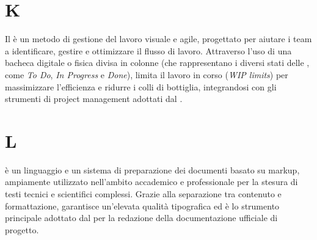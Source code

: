 \section{K}
Il  è un metodo di gestione del lavoro visuale e agile, progettato per aiutare i team a identificare, gestire e ottimizzare il flusso di lavoro. Attraverso l'uso di una bacheca digitale o fisica divisa in colonne (che rappresentano i diversi stati delle , come \emph{To Do}, \emph{In Progress} e \emph{Done}), limita il lavoro in corso (\emph{WIP limits}) per massimizzare l'efficienza e ridurre i colli di bottiglia, integrandosi con gli strumenti di project management adottati dal .
\section{L}
 è un linguaggio e un sistema di preparazione dei documenti basato su markup, ampiamente utilizzato nell'ambito accademico e professionale per la stesura di testi tecnici e scientifici complessi. Grazie alla separazione tra contenuto e formattazione, garantisce un'elevata qualità tipografica ed è lo strumento principale adottato dal  per la redazione della documentazione ufficiale di progetto.
